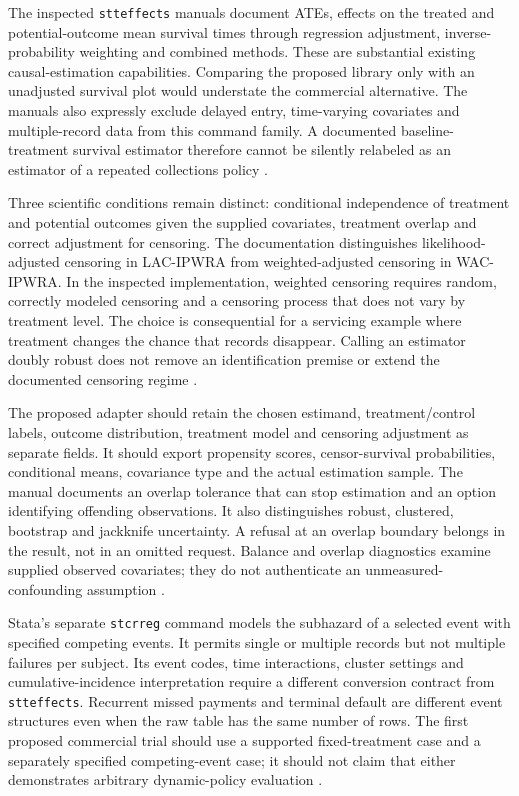 The inspected \texttt{stteffects} manuals document ATEs, effects on the treated
and potential-outcome mean survival times through regression adjustment,
inverse-probability weighting and combined methods. These are substantial
existing causal-estimation capabilities. Comparing the proposed library only
with an unadjusted survival plot would understate the commercial alternative.
The manuals also expressly exclude delayed entry, time-varying covariates and
multiple-record data from this command family. A documented baseline-treatment
survival estimator therefore cannot be silently relabeled as an estimator of
a repeated collections policy \citep{exec14_survival_stata}.

Three scientific conditions remain distinct: conditional independence of
treatment and potential outcomes given the supplied covariates, treatment
overlap and correct adjustment for censoring. The documentation distinguishes
likelihood-adjusted censoring in LAC-IPWRA from weighted-adjusted censoring
in WAC-IPWRA. In the inspected implementation, weighted censoring requires
random, correctly modeled censoring and a censoring process that does not
vary by treatment level. The choice is consequential for a servicing example
where treatment changes the chance that records disappear. Calling an
estimator doubly robust does not remove an identification premise or extend
the documented censoring regime \citep{exec14_survival_stata}.

The proposed adapter should retain the chosen estimand, treatment/control
labels, outcome distribution, treatment model and censoring adjustment as
separate fields. It should export propensity scores, censor-survival
probabilities, conditional means, covariance type and the actual estimation
sample. The manual documents an overlap tolerance that can stop estimation
and an option identifying offending observations. It also distinguishes
robust, clustered, bootstrap and jackknife uncertainty. A refusal at an
overlap boundary belongs in the result, not in an omitted request. Balance
and overlap diagnostics examine supplied observed covariates; they do not
authenticate an unmeasured-confounding assumption
\citep{exec14_survival_stata}.

Stata's separate \texttt{stcrreg} command models the subhazard of a selected
event with specified competing events. It permits single or multiple records
but not multiple failures per subject. Its event codes, time interactions,
cluster settings and cumulative-incidence interpretation require a different
conversion contract from \texttt{stteffects}. Recurrent missed payments and
terminal default are different event structures even when the raw table has
the same number of rows. The first proposed commercial trial should use a
supported fixed-treatment case and a separately specified competing-event
case; it should not claim that either demonstrates arbitrary dynamic-policy
evaluation \citep{exec14_survival_stata_competing}.

